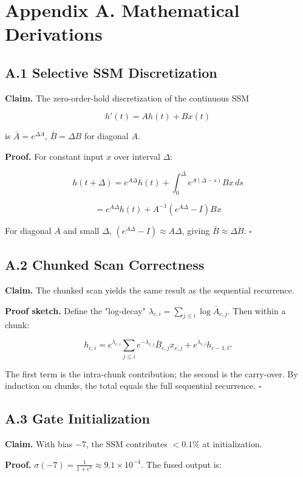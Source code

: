 
\section{Appendix A. Mathematical Derivations}

\subsection{A.1 Selective SSM Discretization}

\textbf{Claim.} The zero-order-hold discretization of the continuous SSM

\[
h'(t) = A h(t) + B x(t)
\tag{A.1}
\]

is $\bar{A} = e^{\Delta A}$, $\bar{B} = \Delta B$ for diagonal $A$.

\textbf{Proof.} For constant input $x$ over interval $\Delta$:

\[
h(t + \Delta) = e^{A \Delta} h(t) + \int_0^\Delta e^{A(\Delta - s)} B x \, ds
\]

\[
= e^{A \Delta} h(t) + A^{-1}(e^{A \Delta} - I) B x
\]

For diagonal $A$ and small $\Delta$, $(e^{A\Delta} - I) \approx A \Delta$, 
giving $\bar{B} \approx \Delta B$. $\square$

\subsection{A.2 Chunked Scan Correctness}

\textbf{Claim.} The chunked scan yields the same result as the sequential 
recurrence.

\textbf{Proof sketch.} Define the "log-decay" $\lambda_{c, i} = \sum_{j \leq i} \log \bar{A}_{c, j}$. 
Then within a chunk:

\[
h_{c, i} = e^{\lambda_{c, i}} \sum_{j \leq i} e^{-\lambda_{c, j}} \bar{B}_{c, j} x_{c, j} + e^{\lambda_{c, i}} h_{c-1, C}
\]

The first term is the intra-chunk contribution; the second is the carry-over. 
By induction on chunks, the total equals the full sequential recurrence. $\square$

\subsection{A.3 Gate Initialization}

\textbf{Claim.} With bias $-7$, the SSM contributes $< 0.1\%$ at initialization.

\textbf{Proof.} $\sigma(-7) = \frac{1}{1 + e^7} \approx 9.1 \times 10^{-4}$. The 
fused output is:

